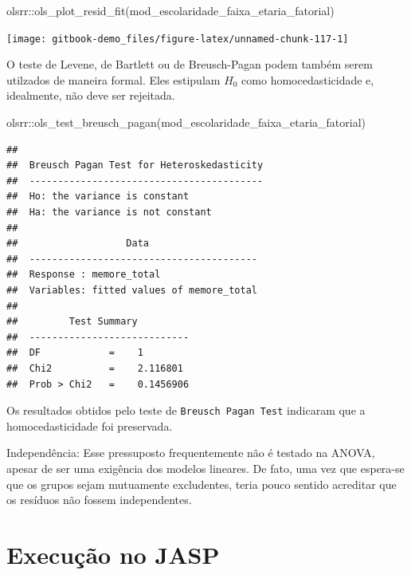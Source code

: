 \documentclass[
]{book}
\newenvironment{Shaded}{\begin{snugshade}}{\end{snugshade}}
\newcommand{\FunctionTok}[1]{\textcolor[rgb]{0.00,0.00,0.00}{#1}}
\newcommand{\NormalTok}[1]{#1}
\newcommand{\SpecialCharTok}[1]{\textcolor[rgb]{0.00,0.00,0.00}{#1}}
\begin{document}
\begin{Shaded}
\begin{Highlighting}[]
\NormalTok{olsrr}\SpecialCharTok{::}\FunctionTok{ols\_plot\_resid\_fit}\NormalTok{(mod\_escolaridade\_faixa\_etaria\_fatorial)}
\end{Highlighting}
\end{Shaded}

\begin{center}\texttt{[image: gitbook-demo\_files/figure-latex/unnamed-chunk-117-1]} \end{center}

O teste de Levene, de Bartlett ou de Breusch-Pagan podem também serem utilzados de maneira formal. Eles estipulam \(H_0\) como homocedasticidade e, idealmente, não deve ser rejeitada.

\begin{Shaded}
\begin{Highlighting}[]
\NormalTok{olsrr}\SpecialCharTok{::}\FunctionTok{ols\_test\_breusch\_pagan}\NormalTok{(mod\_escolaridade\_faixa\_etaria\_fatorial)}
\end{Highlighting}
\end{Shaded}

\begin{verbatim}
## 
##  Breusch Pagan Test for Heteroskedasticity
##  -----------------------------------------
##  Ho: the variance is constant            
##  Ha: the variance is not constant        
## 
##                   Data                   
##  ----------------------------------------
##  Response : memore_total 
##  Variables: fitted values of memore_total 
## 
##         Test Summary         
##  ----------------------------
##  DF            =    1 
##  Chi2          =    2.116801 
##  Prob > Chi2   =    0.1456906
\end{verbatim}

Os resultados obtidos pelo teste de \texttt{Breusch\ Pagan\ Test} indicaram que a homocedasticidade foi preservada.

Independência: Esse pressuposto frequentemente não é testado na ANOVA, apesar de ser uma exigência dos modelos lineares. De fato, uma vez que espera-se que os grupos sejam mutuamente excludentes, teria pouco sentido acreditar que os resíduos não fossem independentes.

\hypertarget{execuuxe7uxe3o-no-jasp-10}{%
\section{Execução no JASP}\label{execuuxe7uxe3o-no-jasp-10}}
\end{document}
